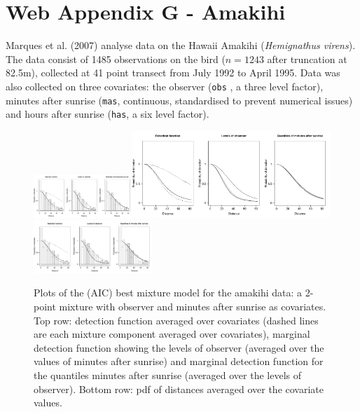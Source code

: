 \documentclass[useAMS,referee]{biom}
\begin{document}
\section*{Web Appendix G - Amakihi}

Marques et al. (2007) analyse data on the Hawaii Amakihi (\textit{Hemignathus virens}). The data consist of 1485 observations on the bird ($n=1243$ after truncation at 82.5m), collected at 41 point transect from July 1992 to April 1995. Data was also collected on three covariates: the observer (\texttt{obs} , a three level factor), minutes after sunrise (\texttt{mas}, continuous, standardised to prevent numerical issues) and hours after sunrise (\texttt{has}, a six level factor).

\begin{figure}
\centering
\includegraphics[width=0.3333\textwidth, trim=0 0 7.133334in 0, clip=true]{analyses/amakihi-om.pdf}\includegraphics[width=0.6666\textwidth, trim=3.566667in 0 0 0, clip=true]{analyses/amakihi-om-hh.pdf}\\
\includegraphics[width=0.4\textwidth]{analyses/amakihi-om.pdf}
\caption{Plots of the (AIC) best mixture model for the amakihi data: a 2-point mixture with observer and minutes after sunrise as covariates. Top row: detection function averaged over covariates (dashed lines are each mixture component averaged over covariates), marginal detection function showing the levels of observer (averaged over the values of minutes after sunrise) and marginal detection function for the quantiles minutes after sunrise (averaged over the levels of observer). Bottom row: pdf of distances averaged over the covariate values.}
\label{amakihi}
\end{figure}
\end{document}
